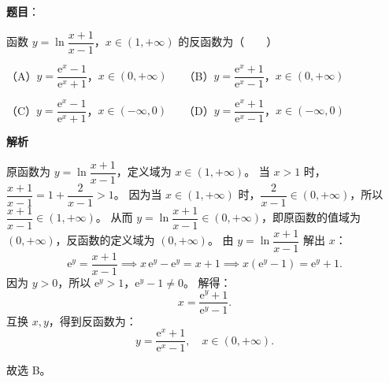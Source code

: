\begin{answer}

\textbf{题目}：

函数 $y = \ln\dfrac{x+1}{x-1}$，$x \in (1, +\infty)$ 的反函数为\mbox{（　　）}

（A）$y = \dfrac{\mathrm{e}^x - 1}{\mathrm{e}^x + 1}$，$x \in (0, +\infty)$　　（B）$y = \dfrac{\mathrm{e}^x + 1}{\mathrm{e}^x - 1}$，$x \in (0, +\infty)$

（C）$y = \dfrac{\mathrm{e}^x - 1}{\mathrm{e}^x + 1}$，$x \in (-\infty, 0)$　　（D）$y = \dfrac{\mathrm{e}^x + 1}{\mathrm{e}^x - 1}$，$x \in (-\infty, 0)$

\textbf{解析}

原函数为 $y = \ln\dfrac{x+1}{x-1}$，定义域为 $x \in (1, +\infty)$。
当 $x > 1$ 时，$\dfrac{x+1}{x-1} = 1 + \dfrac{2}{x-1} > 1$。
因为当 $x \in (1, +\infty)$ 时，$\dfrac{2}{x-1} \in (0, +\infty)$，所以 $\dfrac{x+1}{x-1} \in (1, +\infty)$。
从而 $y = \ln\dfrac{x+1}{x-1} \in (0, +\infty)$，即原函数的值域为 $(0, +\infty)$，反函数的定义域为 $(0, +\infty)$。
由 $y = \ln\dfrac{x+1}{x-1}$ 解出 $x$：
\nopagebreak[4]
\[\mathrm{e}^y = \frac{x+1}{x-1} \implies x\,\mathrm{e}^y - \mathrm{e}^y = x + 1 \implies x(\mathrm{e}^y - 1) = \mathrm{e}^y + 1.\]
因为 $y > 0$，所以 $\mathrm{e}^y > 1$，$\mathrm{e}^y - 1 \ne 0$。
解得：
\nopagebreak[4]
\[x = \frac{\mathrm{e}^y + 1}{\mathrm{e}^y - 1}.\]
互换 $x, y$，得到反函数为：
\nopagebreak[4]
\[y = \frac{\mathrm{e}^x + 1}{\mathrm{e}^x - 1}, \quad x \in (0, +\infty).\]

故选 B。


\end{answer}
